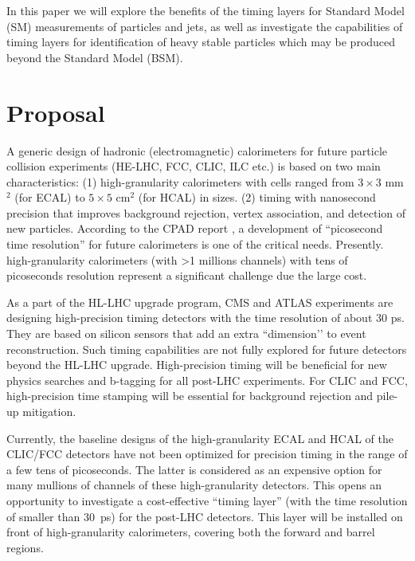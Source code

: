 \documentclass[final,1p,11pt]{elsarticle}
\begin{document}
In this paper we will explore the benefits of the timing layers for Standard Model (SM) measurements of particles and jets, as well as
investigate the capabilities of timing layers for identification of heavy stable particles which may be produced beyond the Standard Model (BSM).


\section{Proposal}

A generic design of hadronic (electromagnetic) calorimeters for future particle collision experiments (HE-LHC, FCC, CLIC, ILC etc.) 
is based on two main characteristics: (1) high-granularity calorimeters with cells ranged from $3\times 3$ mm$^2$ (for ECAL) to $5\times 5$ cm$^2$  (for HCAL) in sizes.
(2) timing with nanosecond precision that improves background rejection, vertex association, and detection of new particles. 
According to the CPAD report \cite{Ahmed:2019sim}, a development of “picosecond time resolution” for future calorimeters is one of the critical needs. 
Presently. high-granularity calorimeters (with >1 millions channels) with tens of picoseconds resolution represent a 
significant challenge due the large cost.

As a part of the HL-LHC upgrade program, CMS and ATLAS experiments are designing high-precision timing detectors with the time resolution of about 30 ps. 
They are based on silicon sensors that add an extra ``dimension’’ to event reconstruction. 
Such timing capabilities are not fully explored for future detectors beyond the HL-LHC upgrade. 
High-precision timing will be beneficial for new physics searches and b-tagging for all post-LHC experiments. 
For CLIC and FCC, high-precision time stamping will be essential for background rejection and pile-up mitigation. 

Currently, the baseline designs of the high-granularity ECAL and HCAL of the CLIC/FCC detectors have not been 
optimized for precision timing in the range of a few tens of picoseconds. 
The latter is considered as an expensive option for many mullions of channels of these high-granularity detectors. 
This opens an opportunity to investigate a cost-effective “timing layer” (with the time resolution of smaller than 30~ps) for the post-LHC detectors. 
This layer will be installed on front of high-granularity calorimeters, covering both the forward and barrel regions.
\end{document}
